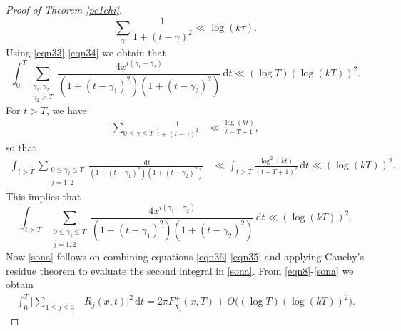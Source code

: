 \documentclass[pdflatex]{sn-jnl}%
\newcommand{\dx}{\mathrm{d}}
\theoremstyle{sltheorems}
\theoremstyle{plainrem}
\theoremstyle{definition}
\begin{document}
\begin{proof}[Proof of Theorem \ref{pc1chi}]
\begin{equation}
\label{eqn34}
    \sum_{\substack{\gamma 
    }}
   \frac{1}{1+(t - \gamma)^2 }
   \ll \log (k \tau).
    \end{equation}
Using \eqref{eqn33}-\eqref{eqn34} we obtain  that
\begin{equation}
    \int_{ 0}^T
    \sum_{\substack{\gamma_1, \gamma_2 \\  \gamma_2   >T 
    }}
   \frac{4 x^{i(\gamma_1 - \gamma_2)}}{(1+(t -\gamma_1)^2) (1+(t-\gamma_2)^2)} \, \dx t
   \label{eqn36}
   \ll  (\log T)(\log (kT))^2.
\end{equation}
For $ t  > T$, we have 
\begin{align*}
\sum_{ 0 \le \gamma \le T}
\frac{1}{1+(t-\gamma)^{2}}
&\ll
\frac{\log (k t)}{ t - T + 1},
\end{align*}
so that
\begin{align}
    \int_{  t > T}  \sum_{\substack{ 0 \le  \gamma_j  \le T \\ j=1,2 
    }}
   \frac{\, \dx t}{(1+(t -\gamma_1)^2) (1+(t-\gamma_2)^2)}  \nonumber 
   & \ll 
   \int_{  t  > T}  
   \frac{\log^2 (k t) }{(t  - T + 1 )^2} \, \dx t
  \ll (\log (kT))^2. 
\end{align}
%
This implies  that
%
\begin{equation}
    \int_{  t > T}  
    \sum_{\substack{ 0 \le \gamma_j   \le T \\ j=1,2 %
    }}
   \frac{4 x^{i(\gamma_1 - \gamma_2)}}{(1+(t -\gamma_1)^2) (1+(t-\gamma_2)^2)} \, \dx t 
   \label{eqn35}
   \ll  (\log (kT))^2.
\end{equation}
%
Now \eqref{sona} follows on 
combining equations \eqref{eqn36}-\eqref{eqn35}
and applying Cauchy's 
residue theorem to evaluate the second integral in \eqref{sona}.
%
From \eqref{eqn8}-\eqref{sona} we obtain
   \begin{align}\label{intlhsrhs}
       \int_{0}^T \big \vert \sum_{1\le  j \le  3} & R_j(x,t)\big \vert ^2 \, \dx t 
  =  2 \pi F^+_{\chi_{_\square}}(x,T) + O\bigl( (\log T)(\log (kT))^2\bigr).

\end{align}
\end{proof}
\end{document}
